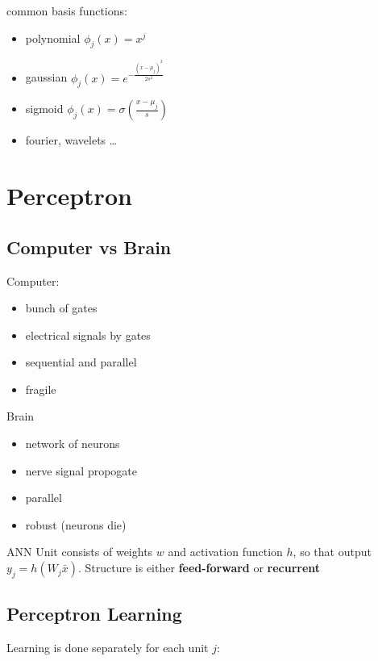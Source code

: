 \documentclass[]{article}
\theoremstyle{definition}
\begin{document}
    \vspace{5mm}

    common basis functions:
    \begin{itemize}
        \item polynomial $\phi_j (x) = x^j$
        \item gaussian $\phi_j (x) = e^{- \frac{(x - \mu_j)^2}{2s^2}}$
        \item sigmoid $\phi_j (x) = \sigma (\frac{x - \mu_j}{s})$
        \item fourier, wavelets \ldots
    \end{itemize}


    \section{Perceptron}
    \label{sec:perceptron}

    \subsection{Computer vs Brain}
    \label{sub:computer_vs_brain}
    Computer:
    \begin{itemize}
        \item bunch of gates
        \item electrical signals by gates
        \item sequential and parallel
        \item fragile
    \end{itemize}
    Brain 
    \begin{itemize}
        \item network of neurons
        \item nerve signal propogate
        \item parallel
        \item robust (neurons die)
    \end{itemize}

    ANN Unit consists of weights $w$ and activation function $h$, so that output $y_j = h(W_j \bar x)$. Structure is either \textbf{feed-forward} or \textbf{recurrent}

    \subsection{Perceptron Learning}
    \label{sub:perceptron_learning}

    Learning is done separately for each unit $j$:
    \begin{algorithmic}
        \EndIf
        \EndFor
    \end{algorithmic}
\end{document}
